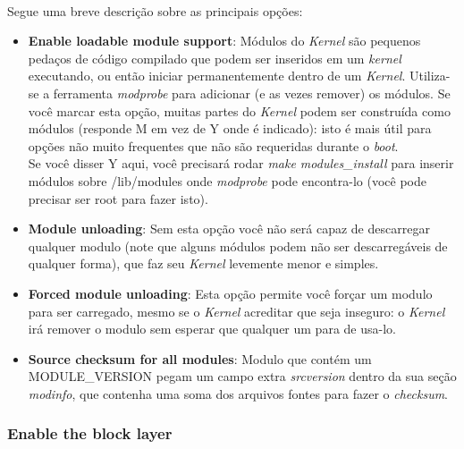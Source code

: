 \documentclass[a4paper,10pt]{article}
\begin{document}
    \paragraph{}
    Segue uma breve descrição sobre as principais opções:
      \begin{itemize}
      \item \textbf{Enable loadable module support}: Módulos do \emph{Kernel} são pequenos pedaços de código compilado que podem ser 
	  inseridos em um \emph{kernel} executando, ou então iniciar permanentemente dentro de um \emph{Kernel}. Utiliza-se a ferramenta 
	\emph{modprobe} para adicionar (e as vezes remover) os módulos. Se você marcar esta opção, muitas partes do \emph{Kernel} podem 
	  ser construída como módulos (responde M em vez de Y onde é indicado): isto é mais útil para opções não muito frequentes que não 
	  são requeridas durante o \emph{boot}.\\
	  Se você disser Y aqui, você precisará rodar \emph{make modules\_install} para inserir módulos sobre /lib/modules onde \emph{modprobe}
	  pode encontra-lo (você pode precisar ser root para fazer isto).
      \item \textbf{Module unloading}: Sem esta opção você não será capaz de descarregar qualquer modulo (note que alguns módulos podem não 
	  ser descarregáveis de qualquer forma), que faz seu \emph{Kernel} levemente menor e simples.
      \item \textbf{Forced module unloading}: Esta opção permite você forçar um modulo para ser carregado, mesmo se o \emph{Kernel} acreditar 
	  que seja inseguro: o \emph{Kernel} irá remover o modulo sem esperar que qualquer um para de usa-lo. 
      \item \textbf{Source checksum for all modules}: Modulo que contém um MODULE\_VERSION pegam um campo extra \emph{srcversion} dentro da sua 
	  seção \emph{modinfo}, que contenha uma soma dos arquivos fontes para fazer o \emph{checksum}.
      \end{itemize}

  \subsubsection{Enable the block layer}
\end{document}
